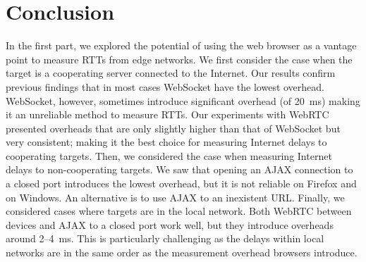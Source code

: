 \documentclass[12pt,twoside]{book}
\begin{document}
\section{Conclusion}

In the first part, we explored the potential of using the web browser as a vantage point to measure RTTs from edge networks. 
We first consider the case when the target is a cooperating server connected to the Internet. Our results confirm previous findings that in most cases WebSocket have the lowest overhead. WebSocket, however, sometimes introduce significant overhead (of 20~ms) making it an unreliable method to measure RTTs. Our experiments with WebRTC presented overheads that are only slightly higher than that of WebSocket but very consistent; making it the best choice for measuring Internet delays to cooperating targets. Then,
we considered the case when measuring Internet delays to non-cooperating targets. We saw that opening an AJAX connection to a closed port introduces the lowest overhead, but it is not reliable on Firefox and on Windows. An alternative is to use AJAX to an inexistent URL.  Finally, we considered cases where targets are in the local network. Both WebRTC between devices and AJAX to a closed port work well, but they introduce overheads around 2--4~ms. This is particularly challenging as the delays within local networks are in the same order as the measurement overhead browsers introduce. 
\end{document}
